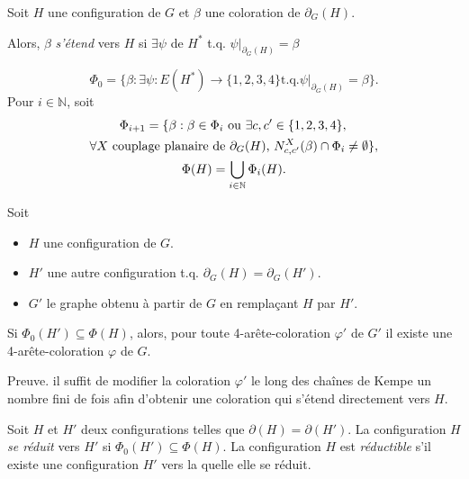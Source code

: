 \documentclass{beamer}
\begin{document}
\begin{frame}
Soit $H$ une configuration de $G$ et $\beta$ une coloration de $\partial_G(H)$. 

Alors, $\beta$ \emph{s'étend} vers $H$ si $\exists \psi$ de $H^*$  t.q.   $\psi|_{\partial_G(H)}= \beta$

$$
\Phi_0 = \{\beta : \exists \psi : E(H^*)\to\{1,2,3,4\} \textrm{t.q.} \psi|_{\partial_G(H)} = \beta\}.
$$
Pour $i\in\mathbb{N}$, soit
$$
\gathered
\Phi_{i+1} = 
\{ 
\beta : 
\beta\in \Phi_i
\textrm{ ou }
\exists c,c'\in \{1,2,3,4\},\,\\ 
\forall X\textrm{ couplage planaire de $\partial_G(H)$, }
N^X_{c,c'}(\beta) \cap \Phi_i \neq \emptyset 
\},\\
\Phi(H)=\bigcup_{i\in \mathbb{N}} \Phi_i(H).
\endgathered
$$
\end{frame}

\begin{frame}
\begin{theorem}
Soit 
\begin{itemize}
\item $H$ une configuration de $G$. 
\item $H'$ une autre configuration t.q. $\partial_G(H)=\partial_G(H')$.
\item $G'$ le graphe obtenu à partir de $G$ en remplaçant $H$ par $H'$.
\end{itemize}

Si $\Phi_0(H')\subseteq \Phi(H)$, alors, pour toute 4-arête-coloration $\varphi'$ de $G'$ il existe une 4-arête-coloration $\varphi$ de $G$.
\end{theorem}

Preuve.
il suffit de modifier la coloration $\varphi'$ le long des chaînes de Kempe un nombre fini de fois afin d'obtenir une coloration qui s'étend directement vers $H$.
\end{frame}

\begin{frame}
Soit $H$ et $H'$ deux configurations telles que $\partial(H)=\partial(H')$. La configuration $H$ \emph{se réduit} vers $H'$ si $\Phi_0(H')\subseteq \Phi(H)$. La configuration $H$ est \emph{réductible} s'il existe une configuration $H'$ vers la quelle elle se réduit.

%
\end{frame}
\end{document}
